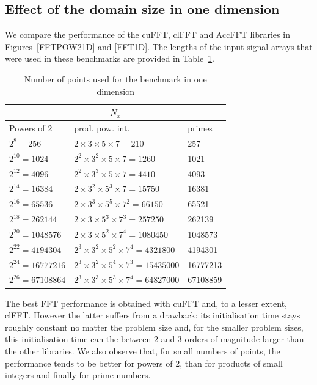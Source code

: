 \documentclass[12pt, a4paper]{article}
\begin{document}
\subsection{Effect of the domain size in one dimension}\label{PERFORMANCE1D}
We compare the performance of the cuFFT, clFFT and AccFFT libraries in
Figures~\ref{FFTPOW21D} and \ref{FFT1D}. The lengths of the input
signal arrays that were used in these benchmarks are provided in
Table~\ref{1DSIZES}.


\begin{table}[H]
\centering
\begin{tabular}{|l|l|l|}
  \hline
  \multicolumn{3}{|c|}{$N_x$}\\
  \hline
  \hline
Powers of 2 & prod. pow. int. & primes\\ \hline
$2^8=256$ & $2\times 3\times 5\times 7 = 210$	& 257 \\ \hline
$2^{10}=1024$ & $2^2\times 3^2\times 5\times 7 = 1260$ & 1021 \\ \hline
$2^{12}=4096$ & $2^2\times 3^3\times 5\times 7 = 4410$ & 4093 \\ \hline
$2^{14}=16384$ & $2\times 3^2\times 5^3\times 7=15750$ & 16381 \\ \hline
$2^{16}=65536$ & $2\times 3^3\times 5^5\times 7^2 = 66150$ & 65521 \\ \hline
$2^{18}=262144$ & $2\times 3\times 5^3\times 7^3 = 257250$ & 262139 \\ \hline
$2^{20}=1048576$ & $2\times 3\times 5^2\times 7^4 = 1080450$ & 1048573 \\ \hline
$2^{22}=4194304$ & $2^3\times 3^2\times 5^2\times 7^4 = 4321800$ & 4194301 \\ \hline
$2^{24}=16777216$ & $2^3\times 3^2\times 5^4\times 7^3 = 15435000$ & 16777213 \\ \hline
$2^{26}=67108864$ & $2^3\times 3^3\times  5^3\times  7^4 = 64827000$ & 67108859 \\ \hline
\end{tabular}
\caption{Number of points used for the benchmark in one dimension}\label{1DSIZES}
\end{table}

The best FFT performance is obtained with cuFFT and, to a lesser
extent, clFFT. However the latter suffers from a drawback: its
initialisation time stays roughly constant no matter the problem size
and, for the smaller problem sizes, this initialisation time can the
between 2 and 3 orders of magnitude larger than the other libraries.
We also observe that, for small numbers of points, the performance
tends to be better for powers of 2, than for products of small
integers and finally for prime numbers.
  
\end{document}
